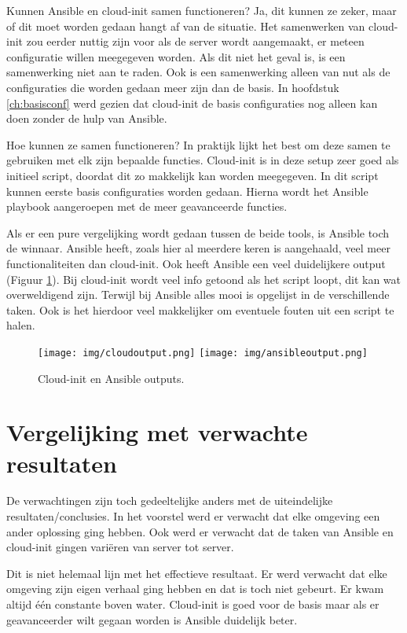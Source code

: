 \newpage
Kunnen Ansible en cloud-init samen functioneren? Ja, dit kunnen ze zeker, maar of dit moet worden gedaan hangt af van de situatie. Het samenwerken van cloud-init zou eerder nuttig zijn voor als de server wordt aangemaakt, er meteen configuratie willen meegegeven worden. Als dit niet het geval is, is een samenwerking niet aan te raden. Ook is een samenwerking alleen van nut als de configuraties die worden gedaan meer zijn dan de basis. In hoofdstuk \ref{ch:basisconf} werd gezien dat cloud-init de basis configuraties nog alleen kan doen zonder de hulp van Ansible.

Hoe kunnen ze samen functioneren? In praktijk lijkt het best om deze samen te gebruiken met elk zijn bepaalde functies. Cloud-init is in deze setup zeer goed als initieel script, doordat dit zo makkelijk kan worden meegegeven. In dit script kunnen eerste basis configuraties worden gedaan. Hierna wordt het Ansible playbook aangeroepen met de meer geavanceerde functies.

Als er een pure vergelijking wordt gedaan tussen de beide tools, is Ansible toch de winnaar. Ansible heeft, zoals hier al meerdere keren is aangehaald, veel meer functionaliteiten dan cloud-init. Ook heeft Ansible een veel duidelijkere output (Figuur \ref{fig:outputs}). Bij cloud-init wordt veel info getoond als het script loopt, dit kan wat overweldigend zijn. Terwijl bij Ansible alles mooi is opgelijst in de verschillende taken. Ook is het hierdoor veel makkelijker om eventuele fouten uit een script te halen.
\begin{figure}[!htb]
    \centering
    {{\texttt{[image: img/cloudoutput.png]} }}%
    \qquad
    {{\texttt{[image: img/ansibleoutput.png]} }}%
    \caption{Cloud-init en Ansible outputs.}%
    \label{fig:outputs}%
\end{figure}

\section{Vergelijking met verwachte resultaten}
De verwachtingen zijn toch gedeeltelijke anders met de uiteindelijke resultaten/conclusies. In het voorstel werd er verwacht dat elke omgeving een ander oplossing ging hebben. Ook werd er verwacht dat de taken van Ansible en cloud-init gingen variëren van server tot server.

Dit is niet helemaal lijn met het effectieve resultaat. Er werd verwacht dat elke omgeving zijn eigen verhaal ging hebben en dat is toch niet gebeurt. Er kwam altijd één constante boven water. Cloud-init is goed voor de basis maar als er geavanceerder wilt gegaan worden is Ansible duidelijk beter. 

